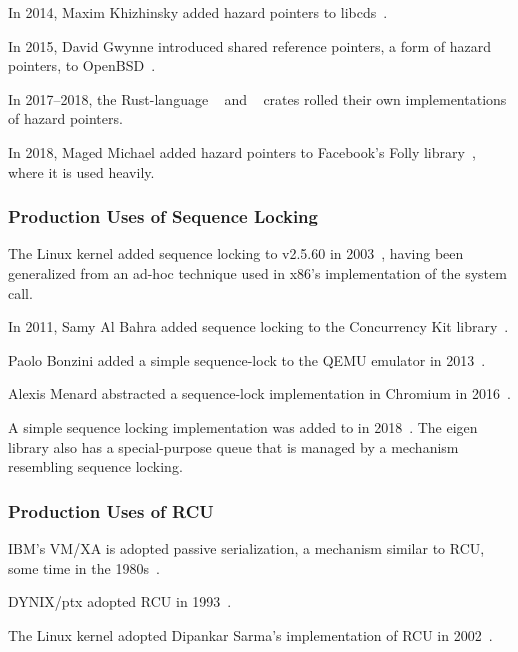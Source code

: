 In 2014, Maxim Khizhinsky added hazard pointers to
libcds~\cite{MaximKhizhinsky2014libcdsHazptr}.

In 2015, David Gwynne introduced shared reference pointers, a form
of hazard pointers, to OpenBSD~\cite{DavidGwynne2015srp}.

In 2017--2018, the Rust-language
~\cite{MichalVaner2018arc-swapHazptr} and
~\cite{crates.io.user.ticki2017concHazptr}
crates rolled their own implementations of hazard pointers.

In 2018, Maged Michael added hazard pointers to Facebook's Folly
library~\cite{MagedMichael2018FollyHazptr}, where it is used heavily.

\subsubsection{Production Uses of Sequence Locking}
\label{sec:defer:Production Uses of Sequence Locking}

The Linux kernel added sequence locking to v2.5.60 in
2003~\cite{JonathanCorbet2003seqlock}, having been generalized from
an ad-hoc technique used in x86's implementation of the
 system call.

In 2011, Samy Al Bahra added sequence locking to the Concurrency Kit
library~\cite{SamyAlBahra2011ckseqlock}.

Paolo Bonzini added a simple sequence-lock to the QEMU emulator in
2013~\cite{PaoloBonzini2013QEMUseqlock}.

Alexis Menard abstracted a sequence-lock implementation in Chromium
in 2016~\cite{AlexisMenard2016ChromiumSeqLock}.

A simple sequence locking implementation was added to 
in 2018~\cite{DavidGoldblatt2018seqlock}.
The eigen library also has a special-purpose queue that is managed by
a mechanism resembling sequence locking.

\subsubsection{Production Uses of RCU}
\label{sec:defer:Production Uses of RCU}

IBM's VM/XA is adopted passive serialization, a mechanism similar to
RCU, some time in the 1980s~\cite{Hennessy89}.

DYNIX/ptx adopted RCU in 1993~\cite{McKenney98,Slingwine95}.

The Linux kernel adopted Dipankar Sarma's implementation of RCU in
2002~\cite{Torvalds2.5.43}.

